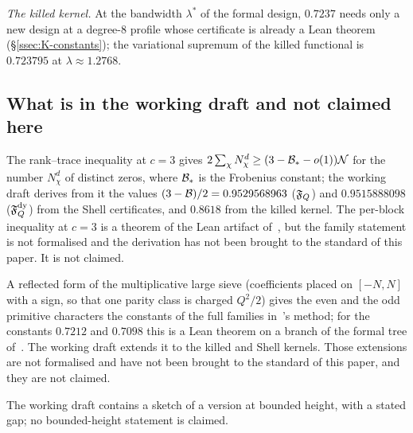 \emph{The killed kernel.} At the bandwidth $\lambda^*$ of the formal design, $0.7237$ needs only a new design at a degree-$8$ profile whose certificate is already a
Lean theorem (\S\ref{ssec:K-constants}); the variational supremum of the killed functional is $0.723795$ at $\lambda\approx1.2768$.

\subsection{What is in the working draft and not claimed here}
\begin{remark}\label{rem:distinct}
The rank--trace inequality at $c=3$ gives $2\sum_\chi N^d_\chi\ge(3-\mathcal B_*-o(1))\mathcal N$ for the number $N^d_\chi$ of distinct zeros, where $\mathcal B_*$ is the Frobenius
constant; the working draft derives from it the values $(3-\mathcal B)/2=0.9529568963$ ($\mathfrak F_Q$) and $0.9515888098$ ($\mathfrak F_Q^{\rm dy}$) from the Shell certificates, and
$0.8618$ from the killed kernel. The per-block inequality at $c=3$ is a theorem of the Lean artifact of~\cite{AF}, but the family statement is not formalised and the
derivation has not been brought to the standard of this paper. It is not claimed.
\end{remark}

\begin{remark}\label{rem:parity}
A reflected form of the multiplicative large sieve (coefficients placed on $[-N,N]$ with a sign, so that one parity class is charged $Q^2/2$) gives the even and the
odd primitive characters the constants of the full families in~\cite{DSouza}'s method; for the constants $0.7212$ and $0.7098$ this is a Lean theorem on a branch of the
formal tree of~\cite{DSouza}. The working draft extends it to the killed and Shell kernels. Those extensions are not formalised and have not been brought to the standard of this paper, and they are not claimed.
\end{remark}

\begin{remark}\label{rem:bounded}
The working draft contains a sketch of a version at bounded height, with a stated gap; no bounded-height statement is claimed.
\end{remark}

